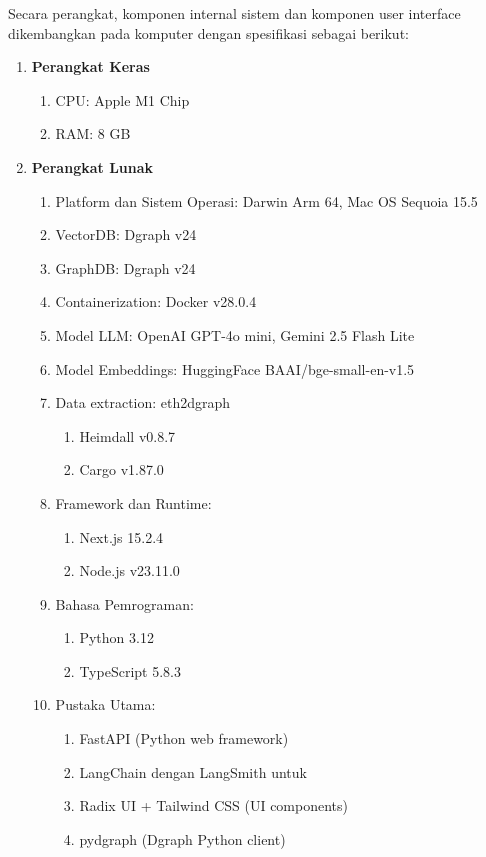 Secara perangkat, komponen internal sistem dan komponen user interface dikembangkan pada komputer dengan spesifikasi sebagai berikut:
\begin{enumerate}
	\item \textbf{Perangkat Keras}
	      \begin{enumerate}
		      \item CPU: Apple M1 Chip
		      \item RAM: 8 GB
	      \end{enumerate}
	\item \textbf{Perangkat Lunak}
	      \begin{enumerate}
		      \item Platform dan Sistem Operasi: Darwin Arm 64, Mac OS Sequoia 15.5
		      \item VectorDB: Dgraph v24
		      \item GraphDB: Dgraph v24
		      \item Containerization: Docker v28.0.4
		      \item Model LLM: OpenAI GPT-4o mini, Gemini 2.5 Flash Lite
		      \item Model Embeddings: HuggingFace BAAI/bge-small-en-v1.5
		      \item Data extraction: eth2dgraph
		            \begin{enumerate}
			            \item Heimdall v0.8.7
			            \item Cargo v1.87.0
		            \end{enumerate}
		      \item Framework dan Runtime:
		            \begin{enumerate}
			            \item Next.js 15.2.4
			            \item Node.js v23.11.0
		            \end{enumerate}
		      \item Bahasa Pemrograman:
		            \begin{enumerate}
			            \item Python 3.12
			            \item TypeScript 5.8.3
		            \end{enumerate}
		      \item Pustaka Utama:
		            \begin{enumerate}
			            \item FastAPI (Python web framework)
			            \item LangChain dengan LangSmith untuk
			            \item Radix UI + Tailwind CSS (UI components)
			            \item pydgraph (Dgraph Python client)
		            \end{enumerate}
	      \end{enumerate}
\end{enumerate}